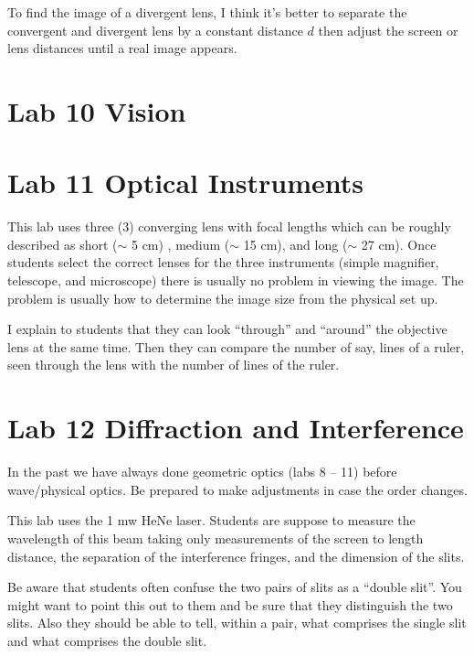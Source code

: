 To find the image of a divergent lens,  I think it's better to separate the convergent and divergent lens by a constant distance $d$ then adjust the screen or lens distances until a real image appears. 

\section{Lab 10 Vision}
\section{Lab 11 Optical Instruments}

This lab uses three (3) converging lens with focal lengths which can be roughly described as short ($\sim$ 5 cm) , medium ($\sim$ 15 cm), and long ($\sim$ 27 cm).  Once students select the correct lenses for the three instruments (simple magnifier, telescope, and microscope) there is usually no problem in viewing the image. The problem is usually how to determine the image size from the physical set up.

I explain to students that they can look ``through'' and ``around'' the objective  lens at the same time. Then they can compare the number of say, lines of a ruler, seen through the lens with the number of lines of the ruler.

\section{Lab 12 Diffraction and Interference}
In the past we have always done geometric optics (labs 8 -- 11) before wave/physical optics. Be prepared to make adjustments in case the order changes.

This lab uses the 1 mw HeNe laser. Students are suppose to measure the wavelength of this beam taking only measurements of the screen to length distance, the separation of the interference fringes, and the dimension of the slits.

Be aware that students often confuse the two pairs of slits as a ``double slit''. You might want to point this out to them and be sure that they distinguish the two slits. Also they should be able to tell, within a pair, what comprises the single slit and what comprises the double slit.

